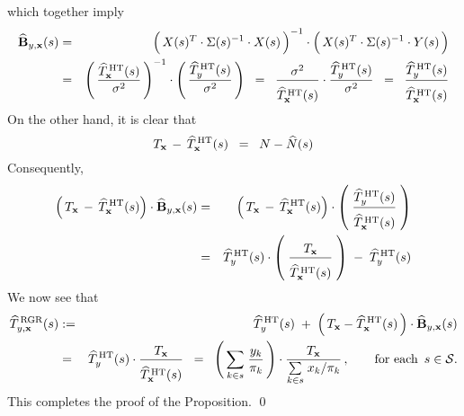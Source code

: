 which together imply
\begin{eqnarray*}
\widehat{\mathbf{B}}_{y,\mathbf{x}}(s)
& = &
	\left(\,X(s)^{T} \overset{{\color{white}!}}{\cdot} \Sigma(s)^{-1} \cdot X(s)\,\right)^{-1}
	\cdot
	\left(\,X(s)^{T} \overset{{\color{white}!}}{\cdot} \Sigma(s)^{-1} \cdot Y(s) \,\right)
\\
& = &
	\left(\, \dfrac{ \widehat{T}^{\,\textnormal{HT}}_{\mathbf{x}}(s) }{\sigma^{2}} \,\right)^{-1}
	\cdot
	\left(\,
		\dfrac{\widehat{T}^{\,\textnormal{HT}}_{y}(s)}{\sigma^{2}}
	\,\right)
\;\; = \;\;
	\dfrac{\sigma^{2}}{\overset{{\color{white}.}}{\widehat{T}^{\,\textnormal{HT}}_{\mathbf{x}}(s)}}
	\cdot
	\dfrac{\widehat{T}^{\,\textnormal{HT}}_{y}(s)}{\sigma^{2}}
\;\; = \;\;
	\dfrac{
		\widehat{T}^{\,\textnormal{HT}}_{y}(s)
	}{
		\overset{{\color{white}.}}{\widehat{T}^{\,\textnormal{HT}}_{\mathbf{x}}(s)}
	}
\end{eqnarray*}
On the other hand, it is clear that
\begin{equation*}
T_{\mathbf{x}} \,-\, \widehat{T}^{\,\textnormal{HT}}_{\mathbf{x}}(s) \;\; = \;\; N - \widehat{N}(s)
\end{equation*}
Consequently,
\begin{eqnarray*}
\left(\,T_{\mathbf{x}} \,-\, \widehat{T}^{\,\textnormal{HT}}_{\mathbf{x}}(s)\right)
\cdot
\widehat{\mathbf{B}}_{y,\mathbf{x}}(s)
& = &
	\left(\,T_{\mathbf{x}} \,-\, \widehat{T}^{\,\textnormal{HT}}_{\mathbf{x}}(s)\right)
	\cdot
	\left(\;
		\dfrac{
			\widehat{T}^{\,\textnormal{HT}}_{y}(s)
		}{
			\overset{{\color{white}.}}{\widehat{T}^{\,\textnormal{HT}}_{\mathbf{x}}(s)}
		}
	\;\right)
\\
& = &
	\widehat{T}^{\,\textnormal{HT}}_{y}(s)
	\cdot
	\left(\;
		\dfrac{
			T_{\mathbf{x}}
		}{
			\overset{{\color{white}.}}{\widehat{T}^{\,\textnormal{HT}}_{\mathbf{x}}(s)}
		}
	\;\right)
	\; - \;
	\widehat{T}^{\,\textnormal{HT}}_{y}(s)
\end{eqnarray*}
We now see that
\begin{eqnarray*}
\widehat{T}^{\,\textnormal{RGR}}_{y,\mathbf{x}}(s)
& := &
	\widehat{T}^{\,\textnormal{HT}}_{y}(s)
	\; + \;
	\left(\,T_{\mathbf{x}} - \widehat{T}^{\,\textnormal{HT}}_{\mathbf{x}}(s) \,\right)
	\cdot
	\widehat{\mathbf{B}}_{y,\mathbf{x}}(s)
\\
& = &
	\widehat{T}^{\,\textnormal{HT}}_{y}(s)
	\cdot
	\dfrac{
		T_{\mathbf{x}}
		}{
		\overset{{\color{white}.}}{\widehat{T}^{\,\textnormal{HT}}_{\mathbf{x}}(s)}
		}
\;\; = \;\;
	\left(\,\underset{k \in s}{\sum}\;\dfrac{y_{k}}{\pi_{k}}\,\right)
	\cdot
 	\dfrac{
		T_{\mathbf{x}}
		}{
		\underset{k \in s}{\sum}\;x_{k}/\pi_{k}
		}
	\,,\quad\quad\textnormal{for each \,$s \in \mathcal{S}$}.
\end{eqnarray*}
This completes the proof of the Proposition.
\qed


\renewcommand{\theenumi}{\roman{enumi}}
\renewcommand{\labelenumi}{\textnormal{(\theenumi)}$\;\;$}

